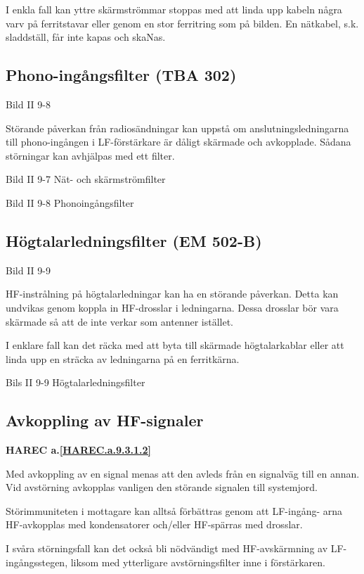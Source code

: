 I enkla fall kan yttre skärmströmmar stoppas med att linda upp kabeln
några varv på ferritstavar eller genom en stor ferritring som på
bilden. En nätkabel, s.k. sladdställ, får inte kapas och skaNas.

\subsection{Phono-ingångsfilter (TBA 302)}

Bild II 9-8

Störande påverkan från radiosändningar kan uppstå om
anslutningsledningarna till phono-ingången i LF-förstärkare är dåligt
skärmade och avkopplade. Sådana störningar kan avhjälpas med ett
filter.

Bild II 9-7 Nät- och skärmströmfilter

Bild II 9-8 Phonoingångsfilter

\subsection{Högtalarledningsfilter (EM 502-B)}

Bild II 9-9

HF-instrålning på högtalarledningar kan ha en störande påverkan. Detta
kan undvikas genom koppla in HF-drosslar i ledningarna.  Dessa
drosslar bör vara skärmade så att de inte verkar som antenner
istället.

I enklare fall kan det räcka med att byta till skärmade högtalarkablar
eller att linda upp en sträcka av ledningarna på en ferritkärna.

Bils II 9-9 Högtalarledningsfilter

\subsection{Avkoppling av HF-signaler}
\textbf{
HAREC a.\ref{HAREC.a.9.3.1.2}\label{myHAREC.a.9.3.1.2}
}

Med avkoppling av en signal menas att den avleds från en signalväg
till en annan. Vid avstörning avkopplas vanligen den störande
signalen till systemjord.

Störimmuniteten i mottagare kan alltså förbättras genom att LF-ingång-
arna HF-avkopplas med kondensatorer och/eller HF-spärras med drosslar.

I svåra störningsfall kan det också bli nödvändigt med HF-avskärmning
av LF-ingångsstegen, liksom med ytterligare avstörningsfilter inne i
förstärkaren.

